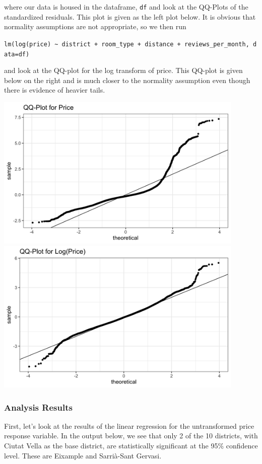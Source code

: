 \documentclass[]{article}
\begin{document}
where our data is housed in the dataframe, \texttt{df} and look at the
QQ-Plots of the standardized residuals. This plot is given as the left
plot below. It is obvious that normality assumptions are not
appropriate, so we then run

\texttt{lm(log(price)\ \textasciitilde{}\ district\ +\ room\_type\ +\ distance\ +\ reviews\_per\_month,\ data=df)}

and look at the QQ-plot for the log transform of price. This QQ-plot is
given below on the right and is much closer to the normality assumption
even though there is evidence of heavier tails.

\includegraphics[width=4.6875in,height=\textheight]{../images/lm1-QQPlot.png}
\includegraphics[width=4.6875in,height=\textheight]{../images/lm2-QQPlot.png}

\hypertarget{analysis-results}{%
\subsubsection{Analysis Results}\label{analysis-results}}

First, let's look at the results of the linear regression for the
untransformed price response variable. In the output below, we see that
only 2 of the 10 districts, with Ciutat Vella as the base district, are
statistically significant at the 95\% confidence level. These are
Eixample and Sarrià-Sant Gervasi.
\end{document}
